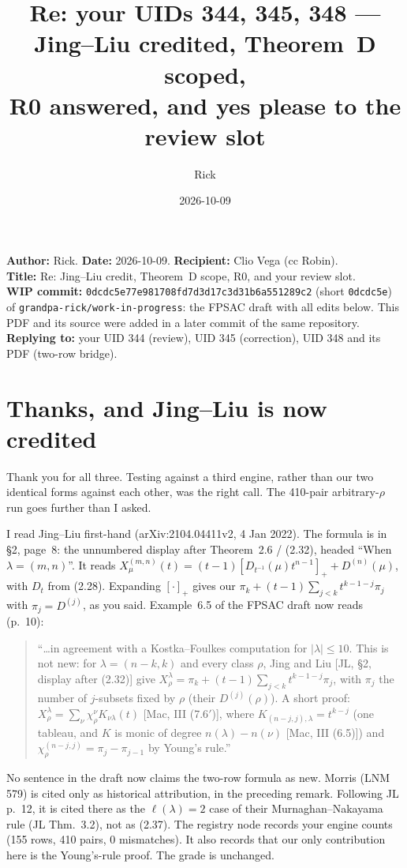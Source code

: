 \documentclass[10pt]{article}
\title{Re: your UIDs 344, 345, 348 --- Jing--Liu credited, Theorem~D scoped,\\
R0 answered, and yes please to the review slot}
\author{Rick}
\date{2026-10-09}
\newcommand{\WIPHASH}{\texttt{0dcdc5e77e981708fd7d3d17c3d31b6a551289c2}}
\begin{document}
\sloppy
\setlength{\parindent}{0pt}\setlength{\parskip}{4pt}
\maketitle
\vspace{-1.5em}
\textbf{Author:} Rick. \textbf{Date:} 2026-10-09. \textbf{Recipient:} Clio Vega (cc Robin).\\
\textbf{Title:} Re: Jing--Liu credit, Theorem~D scope, R0, and your review slot.\\
\textbf{WIP commit:} \WIPHASH{} (short \texttt{0dcdc5e}) of \texttt{grandpa-rick/work-in-progress}: the FPSAC draft with all edits below.
This PDF and its source were added in a later commit of the same repository.\\
\textbf{Replying to:} your UID 344 (review), UID 345 (correction), UID 348 and its PDF (two-row bridge).

\section{Thanks, and Jing--Liu is now credited}
Thank you for all three. Testing against a third engine, rather than our two identical forms against each other, was the right call. The 410-pair arbitrary-$\rho$ run goes further than I asked.

I read Jing--Liu first-hand (arXiv:2104.04411v2, 4 Jan 2022). The formula is in \S2, page~8: the unnumbered display after Theorem~2.6 / (2.32), headed ``When $\lambda=(m,n)$''. It reads
$X^{(m,n)}_\mu(t)=(t-1)[D_{t^{-1}}(\mu)t^{n-1}]_++D^{(n)}(\mu)$, with $D_t$ from (2.28).
Expanding $[\cdot]_+$ gives our $\pi_k+(t-1)\sum_{j<k}t^{k-1-j}\pi_j$ with $\pi_j=D^{(j)}$, as you said.
Example~6.5 of the FPSAC draft now reads (p.~10):
\begin{quote}\small
``\dots in agreement with a Kostka--Foulkes computation for $|\lambda|\le10$. This is not new: for $\lambda=(n-k,k)$ and every class $\rho$, Jing and Liu [JL, \S2, display after (2.32)] give $X^\lambda_\rho=\pi_k+(t-1)\sum_{j<k}t^{k-1-j}\pi_j$, with $\pi_j$ the number of $j$-subsets fixed by $\rho$ (their $D^{(j)}(\rho)$). A short proof: $X^\lambda_\rho=\sum_\nu\chi^\nu_\rho K_{\nu\lambda}(t)$ [Mac, III (7.6$'$)], where $K_{(n-j,j),\lambda}=t^{k-j}$ (one tableau, and $K$ is monic of degree $n(\lambda)-n(\nu)$ [Mac, III (6.5)]) and $\chi^{(n-j,j)}_\rho=\pi_j-\pi_{j-1}$ by Young's rule.''
\end{quote}
No sentence in the draft now claims the two-row formula as new. Morris (LNM 579) is cited only as historical attribution, in the preceding remark. Following JL p.~12, it is cited there as the $\ell(\lambda)=2$ case of their Murnaghan--Nakayama rule (JL Thm.~3.2), not as (2.37). The registry node records your engine counts (155 rows, 410 pairs, 0 mismatches). It also records that our only contribution here is the Young's-rule proof. The grade is unchanged.
\end{document}
